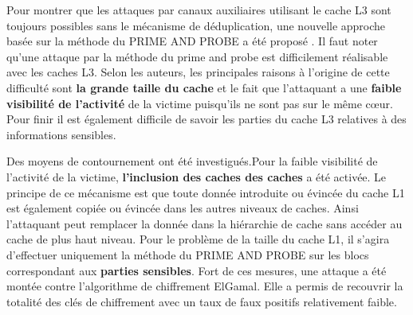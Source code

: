 Pour montrer que les attaques par canaux auxiliaires utilisant le cache L3 sont toujours possibles sans le mécanisme de déduplication, une nouvelle approche basée sur la méthode du PRIME AND PROBE a été proposé \cite{Fangfei}. Il faut noter qu’une attaque par  la méthode du prime and probe est difficilement réalisable avec les caches L3. Selon les auteurs, les principales raisons à l’origine de cette difficulté sont  \textbf{ la grande taille du cache} et le fait que l’attaquant a une \textbf{ faible visibilité de l’activité} de la victime puisqu'ils ne sont pas sur le même cœur. Pour finir il est également difficile de savoir les parties du cache L3 relatives à des informations sensibles. 
\par Des moyens de contournement ont été investigués.Pour la faible visibilité de l’activité de la victime, \textbf{ l’inclusion des caches des caches} a été activée. Le principe de ce mécanisme  est que toute donnée introduite ou évincée du cache L1 est également copiée ou évincée  dans les autres  niveaux de caches. Ainsi l’attaquant  peut remplacer la donnée dans la hiérarchie de cache sans accéder au cache de plus haut niveau. Pour  le problème de la taille  du cache L1, il s’agira d’effectuer uniquement la méthode du PRIME AND PROBE sur les blocs correspondant aux \textbf{parties sensibles}. Fort de ces mesures, une attaque a été montée contre l’algorithme de chiffrement ElGamal\cite{ElGamal}. Elle a permis de recouvrir la totalité des clés de chiffrement avec un taux de faux positifs relativement faible. 
           
